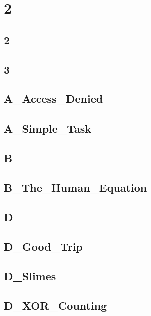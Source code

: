 \section{2}
\subsection{2}
\raggedbottom
\hrulefill
\subsection{3}
\raggedbottom
\hrulefill
\subsection{A_Access_Denied}
\raggedbottom
\hrulefill
\subsection{A_Simple_Task}
\raggedbottom
\hrulefill
\subsection{B}
\raggedbottom
\hrulefill
\subsection{B_The_Human_Equation}
\raggedbottom
\hrulefill
\subsection{D}
\raggedbottom
\hrulefill
\subsection{D_Good_Trip}
\raggedbottom
\hrulefill
\subsection{D_Slimes}
\raggedbottom
\hrulefill
\subsection{D_XOR_Counting}
\raggedbottom
\hrulefill
